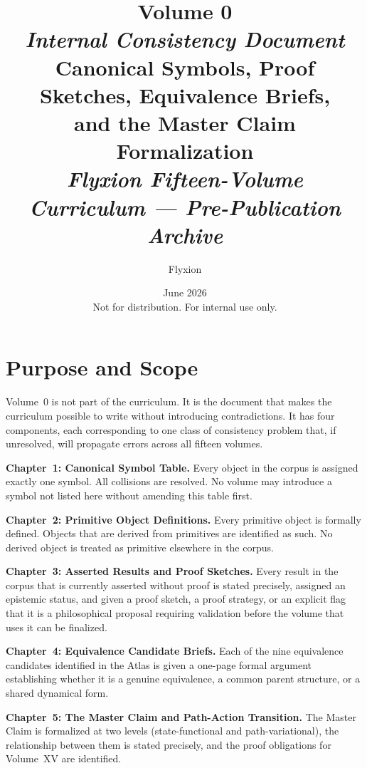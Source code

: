 \documentclass[11pt, a4paper]{book}
\title{%
  \textbf{Volume 0}\\[0.5em]
  \large\textit{Internal Consistency Document}\\[0.3em]
  \normalsize Canonical Symbols, Proof Sketches, Equivalence Briefs,\\
  and the Master Claim Formalization\\[1em]
  \normalsize\textit{Flyxion Fifteen-Volume Curriculum --- Pre-Publication Archive}
}
\author{Flyxion}
\date{June 2026\\[0.3em]
  \small Not for distribution. For internal use only.}
\theoremstyle{flyxion}
\theoremstyle{remark}
\begin{document}

\maketitle
\thispagestyle{empty}

\chapter*{Purpose and Scope}

Volume~0 is not part of the curriculum. It is the document that makes
the curriculum possible to write without introducing contradictions.
It has four components, each corresponding to one class of consistency
problem that, if unresolved, will propagate errors across all fifteen
volumes.

\medskip

\noindent\textbf{Chapter~1: Canonical Symbol Table.} Every object in the
corpus is assigned exactly one symbol. All collisions are resolved.
No volume may introduce a symbol not listed here without amending this
table first.

\noindent\textbf{Chapter~2: Primitive Object Definitions.} Every primitive
object is formally defined. Objects that are derived from primitives
are identified as such. No derived object is treated as primitive
elsewhere in the corpus.

\noindent\textbf{Chapter~3: Asserted Results and Proof Sketches.} Every
result in the corpus that is currently asserted without proof is stated
precisely, assigned an epistemic status, and given a proof sketch,
a proof strategy, or an explicit flag that it is a philosophical proposal
requiring validation before the volume that uses it can be finalized.

\noindent\textbf{Chapter~4: Equivalence Candidate Briefs.} Each of
the nine equivalence candidates identified in the Atlas is given a
one-page formal argument establishing whether it is a genuine
equivalence, a common parent structure, or a shared dynamical form.

\noindent\textbf{Chapter~5: The Master Claim and Path-Action Transition.}
The Master Claim is formalized at two levels (state-functional and
path-variational), the relationship between them is stated precisely,
and the proof obligations for Volume~XV are identified.

\medskip
\end{document}
